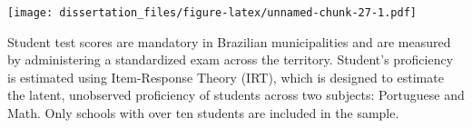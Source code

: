\documentclass[12pt,]{book}
\newenvironment{Shaded}{\begin{snugshade}}{\end{snugshade}}
\newcommand{\DataTypeTok}[1]{\textcolor[rgb]{0.13,0.29,0.53}{#1}}
\newcommand{\DecValTok}[1]{\textcolor[rgb]{0.00,0.00,0.81}{#1}}
\newcommand{\FloatTok}[1]{\textcolor[rgb]{0.00,0.00,0.81}{#1}}
\newcommand{\KeywordTok}[1]{\textcolor[rgb]{0.13,0.29,0.53}{\textbf{#1}}}
\newcommand{\NormalTok}[1]{#1}
\newcommand{\OperatorTok}[1]{\textcolor[rgb]{0.81,0.36,0.00}{\textbf{#1}}}
\newcommand{\StringTok}[1]{\textcolor[rgb]{0.31,0.60,0.02}{#1}}
\begin{document}
\begin{Shaded}
\end{Shaded}

\texttt{[image: dissertation\_files/figure-latex/unnamed-chunk-27-1.pdf]}

Student test scores are mandatory in Brazilian municipalities and are measured by administering a standardized exam across the territory. Student's proficiency is estimated using Item-Response Theory (IRT), which is designed to estimate the latent, unobserved proficiency of students across two subjects: Portuguese and Math. Only schools with over ten students are included in the sample.

\begin{Shaded}
\end{Shaded}
\end{document}
